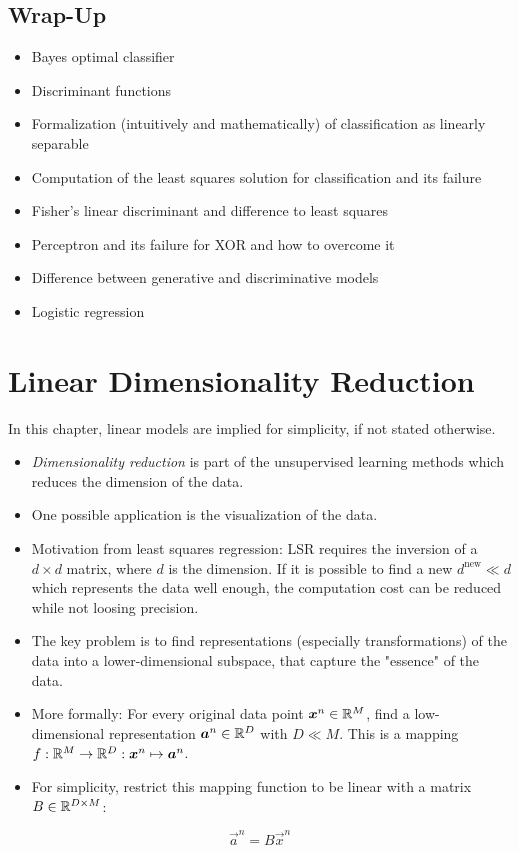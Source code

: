 	\section{Wrap-Up}
		\begin{itemize}
			\item Bayes optimal classifier
			\item Discriminant functions
			\item Formalization (intuitively and mathematically) of classification as linearly separable
			\item Computation of the least squares solution for classification and its failure
			\item Fisher's linear discriminant and difference to least squares
			\item Perceptron and its failure for XOR and how to overcome it
			\item Difference between generative and discriminative models
			\item Logistic regression
		\end{itemize}

\chapter{Linear Dimensionality Reduction}
	In this chapter, linear models are implied for simplicity, if not stated otherwise.

	\begin{itemize}
		\item \emph{Dimensionality reduction} is part of the unsupervised learning methods which reduces the dimension of the data.
		\item One possible application is the visualization of the data.
		\item Motivation from least squares regression: LSR requires the inversion of a \( d \times d \) matrix, where \(d\) is the dimension. If it is possible to find a new \( d^\textrm{new} \ll d \) which represents the data well enough, the computation cost can be reduced while not loosing precision.
		\item The key problem is to find representations (especially transformations) of the data into a lower-dimensional subspace, that capture the "essence" of the data.
		\item More formally: For every original data point \( \bm{x}^n \in \mathbb{R}^M \), find a low-dimensional representation \( \bm{a}^n \in \mathbb{R}^D \) with \( D \ll M \). This is a mapping \( f : \mathbb{R}^M \to \mathbb{R}^D : \bm{x}^n \mapsto \bm{a}^n \).
		\item For simplicity, restrict this mapping function to be linear with a matrix \( B \in \mathbb{R}^{D \times M} \):
	\end{itemize}
	\begin{equation}
		\vec{a}^n = B \vec{x}^n
	\end{equation}

